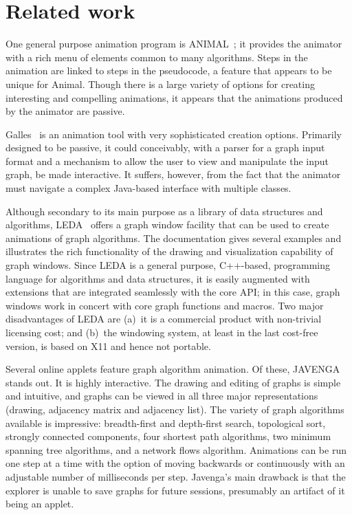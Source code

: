 \section{Related work}\label{sec:related_work}



One general purpose animation program is ANIMAL~\cite{2002-JVLC-Roessling,ANIMAL};
it provides the animator
with a rich menu
of elements common to many algorithms.
Steps in the animation are linked to steps in the pseudocode, a feature that
appears to be unique for Animal.
Though there is a large variety of options for creating interesting and
compelling animations,
it appears that the animations produced by the animator are passive.

Galles~\cite{Galles} is an animation tool with very
sophisticated creation options.
Primarily designed to be passive, it could conceivably, with a parser
for a graph input format and a mechanism to allow the user to view and
manipulate the input graph, be made interactive.
It suffers, however, from the fact that the
animator must navigate a complex Java-based interface with multiple classes.

Although secondary to its main purpose as a library of data structures and
algorithms,
LEDA~\cite{1999-LEDA-Mehlhorn} offers a graph window facility that can be
used to create animations of graph algorithms.
The documentation gives several examples and illustrates the rich functionality of
the drawing and visualization capability of graph windows.
Since LEDA is a general purpose, C++-based, programming language for
algorithms and data structures, it is easily augmented with extensions that
are integrated seamlessly with the core API; in this case, graph windows work
in concert with core graph functions and macros.
Two major disadvantages of LEDA are (a)~it is a commercial product with
non-trivial licensing cost; and (b)~the windowing
system, at least in the last cost-free version, is based on X11 and hence not
portable.

Several online applets feature graph algorithm animation. Of these,
JAVENGA~\cite{JAVENGA} stands out. It is highly interactive. The drawing and
editing of
graphs is simple and intuitive, and graphs can be viewed in all three major
representations (drawing, adjacency matrix and adjacency list).
The variety of graph algorithms available is impressive:
breadth-first and depth-first search, topological sort, strongly connected
components, four shortest path algorithms, two minimum spanning tree
algorithms, and a network flows algorithm.
Animations can be run one step at a time with the option of moving backwards
or continuously with an adjustable number of milliseconds per step.
Javenga's main drawback is that the explorer is unable to save graphs for
future sessions, presumably an artifact of it being an applet.

